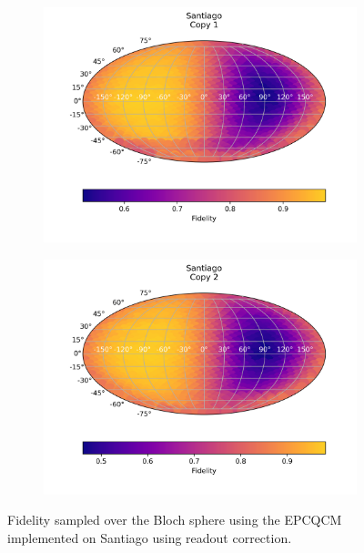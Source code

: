   \begin{figure}[H]
    \centering
    \begin{subfigure}{.5\textwidth}
      \centering
      \includegraphics[width=\textwidth]{Figures/Economical/IBM/FullSphere/results_santiago_copy1.png}
      
      \label{fig:epc_uncorrected_santiago_sphere_1}
    \end{subfigure}%
    \begin{subfigure}{.5\textwidth}
      \centering
      \includegraphics[width=\textwidth]{Figures/Economical/IBM/FullSphere/results_santiago_copy2.png}
      
      \label{fig:epc_uncorrected_santiago_sphere_2}
    \end{subfigure}
    \caption{Fidelity sampled over the Bloch sphere using the EPCQCM implemented on Santiago using readout correction.}
    \label{fig:epc_uncorrected_santiago_sphere}
  \end{figure}
  
